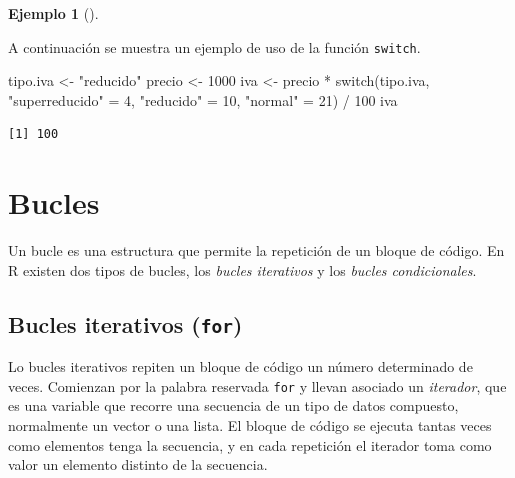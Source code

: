 \documentclass[
  a4paper,
]{scrreport}
\newenvironment{Shaded}{\begin{snugshade}}{\end{snugshade}}
\newcommand{\ControlFlowTok}[1]{\textcolor[rgb]{0.00,0.23,0.31}{#1}}
\newcommand{\DecValTok}[1]{\textcolor[rgb]{0.68,0.00,0.00}{#1}}
\newcommand{\NormalTok}[1]{\textcolor[rgb]{0.00,0.23,0.31}{#1}}
\newcommand{\OtherTok}[1]{\textcolor[rgb]{0.00,0.23,0.31}{#1}}
\newcommand{\SpecialCharTok}[1]{\textcolor[rgb]{0.37,0.37,0.37}{#1}}
\newcommand{\StringTok}[1]{\textcolor[rgb]{0.13,0.47,0.30}{#1}}
\theoremstyle{definition}
\theoremstyle{definition}
\newtheorem{example}{Ejemplo}[chapter]
\theoremstyle{remark}
\begin{document}
\leavevmode{}%
\begin{example}[]\label{exm-condicional-switch}

A continuación se muestra un ejemplo de uso de la función
\texttt{switch}.

\begin{Shaded}
\begin{Highlighting}[]
\NormalTok{tipo.iva }\OtherTok{\textless{}{-}} \StringTok{"reducido"}
\NormalTok{precio }\OtherTok{\textless{}{-}} \DecValTok{1000}
\NormalTok{iva }\OtherTok{\textless{}{-}}\NormalTok{ precio }\SpecialCharTok{*} \ControlFlowTok{switch}\NormalTok{(tipo.iva, }\StringTok{"superreducido"} \OtherTok{=} \DecValTok{4}\NormalTok{, }\StringTok{"reducido"} \OtherTok{=} \DecValTok{10}\NormalTok{, }\StringTok{"normal"} \OtherTok{=} \DecValTok{21}\NormalTok{) }\SpecialCharTok{/} \DecValTok{100}
\NormalTok{iva}
\end{Highlighting}
\end{Shaded}

\begin{verbatim}
[1] 100
\end{verbatim}

\end{example}

\hypertarget{bucles}{%
\section{Bucles}\label{bucles}}

Un bucle es una estructura que permite la repetición de un bloque de
código. En R existen dos tipos de bucles, los \emph{bucles iterativos} y
los \emph{bucles condicionales}.

\hypertarget{bucles-iterativos-for}{%
\subsection{\texorpdfstring{Bucles iterativos
(\texttt{for})}{Bucles iterativos (for)}}\label{bucles-iterativos-for}}

Lo bucles iterativos repiten un bloque de código un número determinado
de veces. Comienzan por la palabra reservada \texttt{for} y llevan
asociado un \emph{iterador}, que es una variable que recorre una
secuencia de un tipo de datos compuesto, normalmente un vector o una
lista. El bloque de código se ejecuta tantas veces como elementos tenga
la secuencia, y en cada repetición el iterador toma como valor un
elemento distinto de la secuencia.
\end{document}
